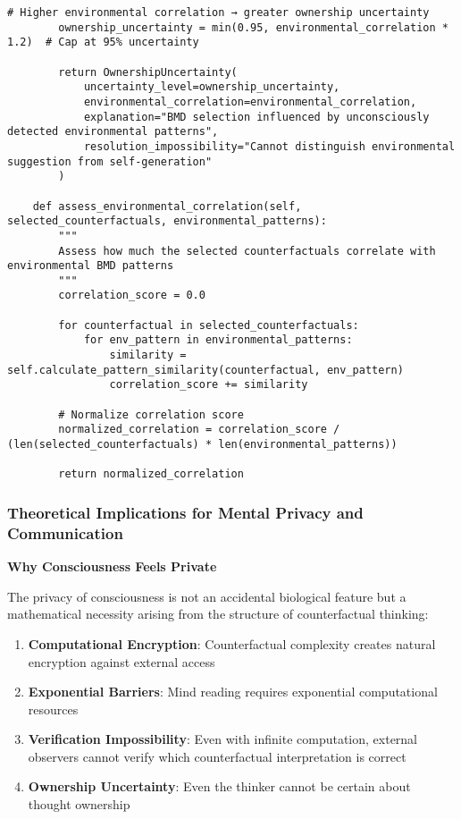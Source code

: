 \documentclass[12pt,a4paper]{article}
\begin{document}
\begin{lstlisting}[style=pythonstyle, caption=Environmental Suggestion Uncertainty Implementation]
        # Higher environmental correlation → greater ownership uncertainty
        ownership_uncertainty = min(0.95, environmental_correlation * 1.2)  # Cap at 95% uncertainty
        
        return OwnershipUncertainty(
            uncertainty_level=ownership_uncertainty,
            environmental_correlation=environmental_correlation,
            explanation="BMD selection influenced by unconsciously detected environmental patterns",
            resolution_impossibility="Cannot distinguish environmental suggestion from self-generation"
        )
    
    def assess_environmental_correlation(self, selected_counterfactuals, environmental_patterns):
        """
        Assess how much the selected counterfactuals correlate with environmental BMD patterns
        """
        correlation_score = 0.0
        
        for counterfactual in selected_counterfactuals:
            for env_pattern in environmental_patterns:
                similarity = self.calculate_pattern_similarity(counterfactual, env_pattern)
                correlation_score += similarity
                
        # Normalize correlation score
        normalized_correlation = correlation_score / (len(selected_counterfactuals) * len(environmental_patterns))
        
        return normalized_correlation
\end{lstlisting}

\subsubsection{Theoretical Implications for Mental Privacy and Communication}

\textbf{Why Consciousness Feels Private}

The privacy of consciousness is not an accidental biological feature but a mathematical necessity arising from the structure of counterfactual thinking:

\begin{enumerate}
\item \textbf{Computational Encryption}: Counterfactual complexity creates natural encryption against external access
\item \textbf{Exponential Barriers}: Mind reading requires exponential computational resources
\item \textbf{Verification Impossibility}: Even with infinite computation, external observers cannot verify which counterfactual interpretation is correct
\item \textbf{Ownership Uncertainty}: Even the thinker cannot be certain about thought ownership
\end{enumerate}
\end{document}
